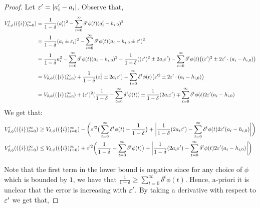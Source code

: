 \begin{proof}
     Let $\varepsilon'=|a'_i-a_i|$. Observe that,
\begin{align*}
   V'_{\delta,\phi}((\{i\})_{t=0}^\infty) &=   \frac{1}{1-\delta}(a'_i)^2 - \sum_{t=0}^\infty \delta^t \phi(t)(a'_i-h_{i,0})^2 \\
   &= \frac{1}{1-\delta}(a_i\pm \varepsilon_i)^2 - \sum_{t=0}^\infty \delta^t \phi(t)(a_i-h_{i,0}\pm \varepsilon')^2 \\
   &= \frac{1}{1-\delta}a_i^2 - \sum_{t=0}^\infty \delta^t \phi(t)(a_i-h_{i,0})^2 + \frac{1}{1-\delta}((\varepsilon')^2 \pm 2a_i \varepsilon') -  \sum_{t=0}^\infty \delta^t \phi(t)\big((\varepsilon')^2 \pm  2\varepsilon' \cdot (a_i-h_{i,0}) \big) \\
   &=V_{\delta,\phi}((\{i\})_{t=0}^\infty)  + \frac{1}{1-\delta}(\varepsilon_i^2 \pm 2a_i \varepsilon') -  \sum_{t=0}^\infty \delta^t \phi(t)\big(\varepsilon'^2 \pm  2\varepsilon' \cdot (a_i-h_{i,0}) \big)\\
   &= V_{\delta,\phi}((\{i\})_{t=0}^\infty)+ (\varepsilon')^2(\frac{1}{1-\delta}-\sum_{t=0}^\infty \delta^t \phi(t)) \pm \frac{1}{1-\delta} (2a_i\varepsilon')\mp \sum_{t=0}^\infty \delta^t \phi(t)2\varepsilon'(a_i-h_{i.0})
\end{align*}
We get that:
\begin{align*}
    V'_{\delta,\phi}((\{i\})_{t=0}^\infty) &\geq V_{\delta,\phi}((\{i\})_{t=0}^\infty)-\bigg(\varepsilon'^2\big(\sum_{t=0}^\infty \delta^t \phi(t) - \frac{1}{1-\delta}\big) + \bigg|\frac{1}{1-\delta} (2a_i\varepsilon') - \sum_{t=0}^\infty \delta^t \phi(t)2\varepsilon'(a_i-h_{i,0})\bigg| \bigg) \\
 V'_{\delta,\phi}((\{i\})_{t=0}^\infty) &\leq V_{\delta,\phi}((\{i\})_{t=0}^\infty)+ \varepsilon'^2\bigg(\frac{1}{1-\delta}-\sum_{t=0}^\infty \delta^t \phi(t)\big) + \bigg|\frac{1}{1-\delta} (2a_i\varepsilon') - \sum_{t=0}^\infty \delta^t \phi(t)2\varepsilon'(a_i-h_{i,0})\bigg| \bigg)
\end{align*} 


Note that the first term in the lower bound is negative since for any choice of $\phi$ which is bounded by $1$, we have that $\frac{1}{1-\delta} \geq \sum_{t=0}^\infty \delta^t \phi(t)$. Hence, a-priori it is unclear that the error is increasing with $\varepsilon'$. By taking a derivative with respect to $\varepsilon'$ we get that,


\end{proof}
